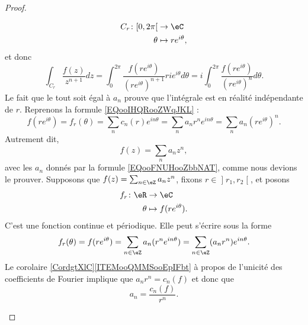 \begin{proof}
\begin{subproof}
			\begin{equation}
				\begin{aligned}
					C_r\colon \mathopen[ 0 , 2\pi \mathclose[ & \to \eC                \\
					\theta                                    & \mapsto r e^{i\theta},
				\end{aligned}
			\end{equation}
			et donc
			\begin{equation}
				\int_{C_r}\frac{ f(z) }{ z^{n+1} }dz=\int_0^{2\pi}\frac{ f(r e^{i\theta}) }{ (r e^{i\theta})^{n+1} }ri e^{i\theta}d\theta=i\int_0^{2\pi}\frac{ f(r e^{i\theta}) }{ (r e^{i\theta})^n }d\theta.
			\end{equation}
			Le fait que le tout soit égal à \( a_n\) prouve que l'intégrale est en réalité indépendante de \( r\).
			\spitem[Conclusion]
			Reprenons la formule \eqref{EQooIHQRooZWqJKL} :
			\begin{equation}
				f(r e^{i\theta})=f_r(\theta)=\sum_nc_n(r) e^{in\theta}=\sum_na_nr^n e^{in\theta}=\sum_na_n(r e^{i\theta})^n.
			\end{equation}
			Autrement dit,
			\begin{equation}
				f(z)=\sum_na_nz^n,
			\end{equation}
			avec les \( a_n\) donnés par la formule \eqref{EQooFNUHooZbbNAT}, comme nous devions le prouver.
			Supposons que \( f(z)=\sum_{n\in \eZ}a_nz^n\), fixons \( r\in \mathopen] r_1 , r_2 \mathclose[\), et posons
			\begin{equation}
				\begin{aligned}
					f_r\colon \eR & \to \eC                   \\
					\theta        & \mapsto f(r e^{i\theta}).
				\end{aligned}
			\end{equation}
			C'est une fonction continue et périodique. Elle peut s'écrire sous la forme
			\begin{equation}
				f_r(\theta)=f(r e^{i\theta})=\sum_{n\in \eZ}a_n(r^n e^{in\theta})=\sum_{n\in \eZ}(a_nr^n) e^{in\theta}.
			\end{equation}
			Le corolaire \ref{CordgtXlC}\ref{ITEMooQMMSooEpIFbt} à propos de l'unicité des coefficients de Fourier implique que \( a_nr^n=c_n(f)\) et donc que
			\begin{equation}        \label{EQooBNSMooGLIBqU}
				a_n=\frac{ c_n(f) }{ r^n }.
			\end{equation}

\end{subproof}
\end{proof}
